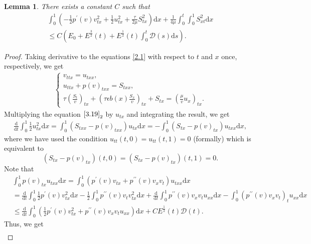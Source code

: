 \documentclass[10pt,reqno]{amsart}
\numberwithin{equation}{section}
\newtheorem{lemma}[theorem]{Lemma}
\newcommand{\dif}{\mathrm{d}}
\begin{document}

\begin{lemma}\label{Le3.8}
There exists a constant $C$ such that
\begin{align}
\int_0^1 \left(-\frac{1}{2} p^\prime(v)v_{tx}^2+\frac{1}{2}u_{tx}^2+\frac{\tau}{2\mu}S_{tx}^2 \right)\dif x +\frac{1}{4\mu}\int_0^t\int_0^1 S_{xt}^2 \dif x \nonumber \\ 
 \le C\left(E_0+E^\frac{3}{2}(t)+ E^\frac{1}{2}(t) \int_0^t \mathcal D(s)\dif s \right). \label{3.18}
\end{align}
\end{lemma}

\begin{proof}
Taking derivative to the equations \eqref{2.1} with respect to $t$ and $x$ once, respectively, we get
\begin{align}\label{3.19}
\begin{cases}
v_{ttx}=u_{txx},\\
u_{ttx}+p(v)_{txx}=S_{txx},\\
\tau \left(\frac{S_t}{v}\right)_{tx}+\left(\tau \epsilon b(x)\frac{S_x}{v} \right)_{tx}+S_{tx}=\left(\frac{\mu}{v} u_x\right)_{tx}.
\end{cases}
\end{align}
Multiplying the  equation $\eqref{3.19}_2$ by $u_{tx}$ and integrating the result, we get
\begin{align*}
\frac{\dif}{\dif t} \int_0^1 \frac{1}{2} u_{tx}^2 \dif x =\int_0^1 (S_{txx}-p(v)_{txx})u_{tx}\dif x =-\int_0^1 (S_{tx}-p(v)_{tx}) u_{txx}\dif x,
\end{align*}
where we have used the condition $u_{tt}(t,0)=u_{tt}(t,1)=0$ (formally) which is equivalent to $$(S_{tx}-p(v)_{tx})(t,0)=(S_{tx}-p(v)_{tx})(t,1)=0.$$
Note that
\begin{align*}
&\int_0^1 p(v)_{tx} u_{txx}\dif x =\int_0^1 (p^\prime(v) v_{tx} +p^{\prime\prime}(v) v_x v_t) u_{txx}\dif x\\
&=\frac{\dif}{\dif t} \int_0^1 \frac{1}{2} p^\prime(v)v_{tx}^2 \dif x-\frac{1}{2}\int_0^1 p^{\prime\prime}(v) v_t v_{tx}^2 \dif x+\frac{\dif}{\dif t} \int_0^1 p^{\prime\prime}(v) v_x v_t u_{xx}\dif x-\int_0^1 (p^{\prime\prime}(v) v_x v_t)_t u_{xx}\dif x\\
&\le \frac{\dif}{\dif t} \int_0^1 (\frac{1}{2} p^\prime(v)v_{tx}^2+p^{\prime\prime}(v) v_x v_t u_{xx}) \dif x+C E^\frac{1}{2}(t) \mathcal D(t).
\end{align*}
Thus, we get
\begin{align}\label{3.20}

\end{align}
\end{proof}
\end{document}
